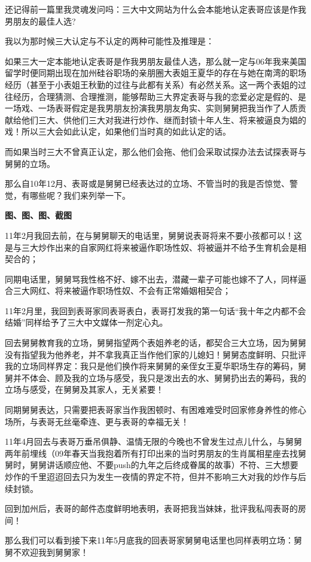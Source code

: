 \documentclass[9pt, b5paper]{article}
\begin{document}
还记得前一篇里我灵魂发问吗：三大中文网站为什么会本能地认定表哥应该是作我男朋友的最佳人选?

我以为那时候三大认定与不认定的两种可能性及推理是：

如果三大一定本能地认定表哥是作我男朋友最佳人选，那么就一定与06年我来美国留学时便同期出现在加州硅谷职场的亲朋圈大表姐王夏华的存在与她在南湾的职场经历（甚至于小表姐王秋勤的过往与此都有关系）有必然关系。这一两个表姐的过往经历，合理猜测、合理推测，能够帮助三大界定表哥与我的恋爱必定是假的、是一场戏、一场表哥假定是我男朋友扮演我男朋友角实、实则舅舅把我当作了人质贡献给他们三大、供他们三大对我进行炒作、继而封锁十年人生、将来被逼良为娼的戏！所以三大会如此认定，如果他们当时真的如此认定的话。

而如果当时三大不曾真正认定，那么他们会拖、他们会采取试探办法去试探表哥与舅舅的立场。

那么自10年12月、表哥或是舅舅已经表达过的立场、不管当时的我是否惊觉、警觉，有哪些呢？我们来列举一下。  

\textbf{图、图、图、截图}

11年2月我回去前，在与舅舅聊天的电话里，舅舅说表哥将来不要小孩都可以！这是与三大炒作出来的自家网红将来被逼作职场性奴、将被逼并不给予生育机会是相契合的；

同期电话里，舅舅骂我性格不好、嫁不出去，潜藏一辈子可能也嫁不了人，同样逼合三大网红、将来被逼作职场性奴、不会有正常婚姻相契合；

11年2月里，我回到表哥家同表哥表白，表哥打发我的第一句话“我十年之内都不会结婚”同样给予了三大中文媒体一剂定心丸。

回去舅舅教育我的立场，舅舅指望两个表姐养老的话，都契合三大立场，因为舅舅没有指望我为他养老，并不拿我真正当作他们家的儿媳妇！舅舅态度鲜明、只批评我的立场同样界定：我只是他们换作将来舅舅的亲侄女王夏华职场生存的筹码，舅舅并不体会、顾及我的立场与感受，我只是泼出去的水、舅舅扔出去的筹码，我的立场与感受，在舅舅及其家人，无关紧要！

同期舅舅表达，只需要把表哥家当作我困顿时、有困难难受时回家修身养性的修心场所，与表哥无丝毫牵连、更与表哥的幸福无关！

11年4月回去与表哥万垂吊俱静、温情无限的今晚也不曾发生过点儿什么，与舅舅两年前埋线（09年春天当我抱着所有打印出来的当时男朋友的生肖属相星座去找舅舅时，舅舅讲话顺应他、不要push的九年之后终成眷属的故事）不符、三大想要炒作的千里迢迢回去只为发生一夜情的界定不符，但并不影响三大对我的炒作与后续封锁。

回到加州后，表哥的邮件态度鲜明地表明，表哥把我当妹妹，批评我私闯表哥的房间！

那么我们可以看到接下来11年5月底我的回表哥家舅舅电话里也同样表明立场：舅舅不欢迎我到舅舅家！
\end{document}
